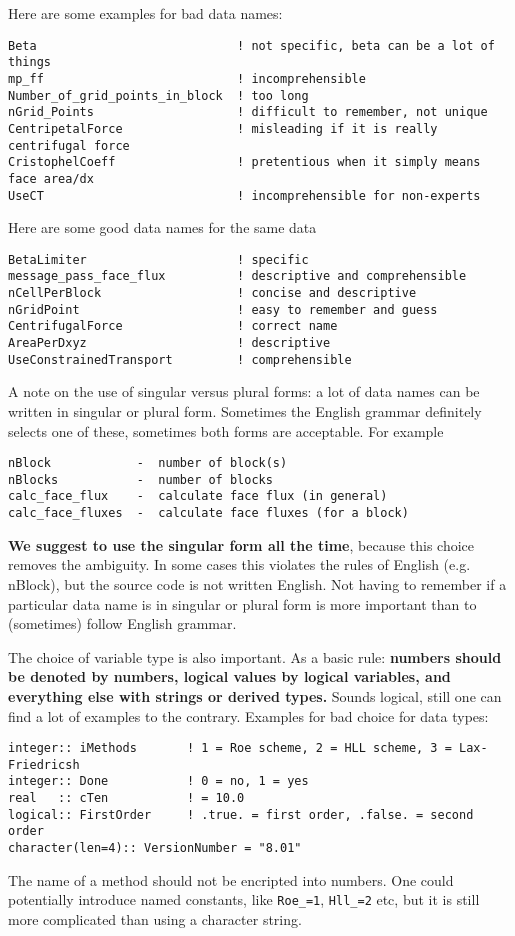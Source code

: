 \documentclass{article}
\begin{document}
Here are some examples for bad data names:
\begin{verbatim}
Beta                            ! not specific, beta can be a lot of things
mp_ff                           ! incomprehensible
Number_of_grid_points_in_block  ! too long
nGrid_Points                    ! difficult to remember, not unique
CentripetalForce                ! misleading if it is really centrifugal force
CristophelCoeff                 ! pretentious when it simply means face area/dx
UseCT                           ! incomprehensible for non-experts
\end{verbatim}
Here are some good data names for the same data
\begin{verbatim}
BetaLimiter                     ! specific
message_pass_face_flux          ! descriptive and comprehensible
nCellPerBlock                   ! concise and descriptive
nGridPoint                      ! easy to remember and guess
CentrifugalForce                ! correct name
AreaPerDxyz                     ! descriptive
UseConstrainedTransport         ! comprehensible
\end{verbatim}
A note on the use of singular versus plural forms: 
a lot of data names can be written in singular or plural form. 
Sometimes the English grammar definitely selects one of these, sometimes
both forms are acceptable. For example
\begin{verbatim}
nBlock            -  number of block(s) 
nBlocks           -  number of blocks
calc_face_flux    -  calculate face flux (in general)
calc_face_fluxes  -  calculate face fluxes (for a block)
\end{verbatim}
{\bf We suggest to use the singular form all the time}, because
this choice removes the ambiguity. In some cases this violates the rules of
English (e.g. nBlock), but the source code is not written English. 
Not having to remember if a particular data name is in singular 
or plural form is more important than to (sometimes) follow English grammar.

The choice of variable type is also important. As a basic rule:
{\bf numbers should be denoted by numbers, logical values by logical variables,
and everything else with strings or derived types.}
Sounds logical, still one can find a lot of examples to the contrary.
Examples for bad choice for data types:
\begin{verbatim}
integer:: iMethods       ! 1 = Roe scheme, 2 = HLL scheme, 3 = Lax-Friedricsh
integer:: Done           ! 0 = no, 1 = yes
real   :: cTen           ! = 10.0
logical:: FirstOrder     ! .true. = first order, .false. = second order
character(len=4):: VersionNumber = "8.01"
\end{verbatim}
The name of a method should not be encripted into numbers. One could
potentially introduce named constants, like {\tt Roe\_=1}, {\tt Hll\_=2} etc,
but it is still more complicated than using a character string.
\end{document}
